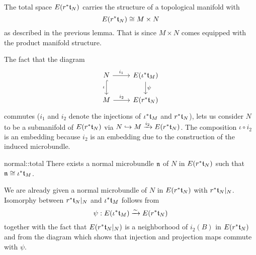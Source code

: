\begin{myparagraph}
    The total space $E(r^*\mathfrak{t}_N)$ carries the structure of a topological manifold with
    \[ E(r^*\mathfrak{t}_N) \cong M \times N \]
    as described in the previous lemma.
    That is since $M \times N$ comes equipped with the product manifold structure.

    The fact that the diagram
    \[
        \begin{tikzcd}
            N \ar[r, "i_1"] \ar[hookrightarrow, "\iota"']{d} & E(\ind{\iota}\bt_M) \ar[d, "\psi"] \\
            M \ar[r, "i_2"] & E(\ind{r}\bt_N)
        \end{tikzcd}
    \]
    commutes ($i_1$ and $i_2$ denote the injections of $\iota^*\mathfrak{t}_M$ and $r^*\mathfrak{t}_N$),
    lets us consider $N$ to be a submanifold of $E(r^*\mathfrak{t}_N)$ via $N \hookrightarrow{} M \xrightarrow{i_2} E(r^*\mathfrak{t}_N)$.
    The composition $\iota \circ i_2$ is an embedding because $i_2$ is an embedding
    due to the construction of the induced microbundle.
\end{myparagraph}

\begin{mylemma}{normal::total}
    There exists a normal microbundle $\mathfrak{n}$ of $N$ in $E(r^*\mathfrak{t}_N)$ such that $\mathfrak{n} \cong \iota^*\mathfrak{t}_M$.
\end{mylemma}

\begin{myproof}
    We are already given a normal microbundle of $N$ in $E(r^*\mathfrak{t}_N)$ with $r^*\mathfrak{t}_N\vert_{N}$.
    Isomorphy between $r^*\mathfrak{t}_N\vert_{N}$ and $\iota^*\mathfrak{t}_M$ follows from
    \[ \psi: E(\iota^*\mathfrak{t}_M) \xrightarrow{\sim} E(r^*\mathfrak{t}_N) \]
    together with the fact that $E(r^*\mathfrak{t}_N\vert_{N})$ is a neighborhood of $i_2(B)$ in $E(r^*\mathfrak{t}_N)$
    and from the diagram which shows that injection and projection maps commute with $\psi$.
\end{myproof}